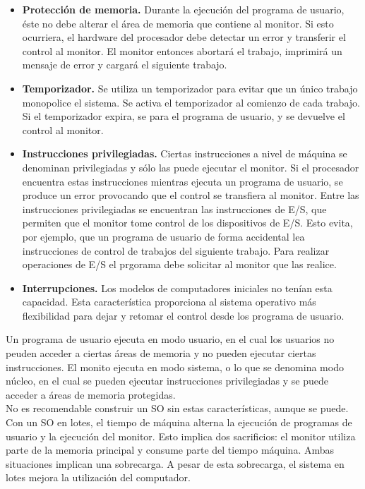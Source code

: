 \documentclass{article}
\begin{document}
					\begin{itemize}
					\item \textbf{Protección de memoria.} Durante la ejecución del programa de usuario, éste no debe alterar el área de memoria que contiene al monitor. Si esto ocurriera, el hardware del procesador debe detectar un error y transferir el control al monitor. El monitor entonces abortará el trabajo, imprimirá un mensaje de error y cargará el siguiente trabajo.
					
					\item \textbf{Temporizador.} Se utiliza un temporizador para evitar que un único trabajo monopolice el sistema. Se activa el temporizador al comienzo de cada trabajo. Si el temporizador expira, se para el programa de usuario, y se devuelve el control al monitor.
					
					\item \textbf{Instrucciones privilegiadas.} Ciertas instrucciones a nivel de máquina se denominan privilegiadas y sólo las puede ejecutar el monitor. Si el procesador encuentra estas instrucciones mientras ejecuta un programa de usuario, se produce un error provocando que el control se transfiera al monitor. Entre las instrucciones privilegiadas se encuentran las instrucciones de E/S, que permiten que el monitor tome control de los dispositivos de E/S. Esto evita, por ejemplo, que un programa de usuario de forma accidental lea instrucciones de control de trabajos del siguiente trabajo. Para realizar operaciones de E/S el prgorama debe solicitar al monitor que las realice.
					
					\item \textbf{Interrupciones.} Los modelos de computadores iniciales no tenían esta capacidad. Esta característica proporciona al sistema operativo más flexibilidad para dejar y retomar el control desde los programa de usuario.
					\end{itemize}
							
					Un programa de usuario ejecuta en modo usuario, en el cual los usuarios no peuden acceder a ciertas áreas de memoria y no pueden ejecutar ciertas instrucciones. El monito ejecuta en modo sistema, o lo que se denomina modo núcleo, en el cual se pueden ejecutar instrucciones privilegiadas y se puede acceder a áreas de memoria protegidas. \\
					
					No es recomendable construir un SO sin estas características, aunque se puede. Con un SO en lotes, el tiempo de máquina alterna la ejecución de programas de usuario y la ejecución del monitor. Esto implica dos sacrificios: el monitor utiliza parte de la memoria principal y consume parte del tiempo máquina. Ambas situaciones implican una sobrecarga. A pesar de esta sobrecarga, el sistema en lotes mejora la utilización del computador.	\\
					
\end{document}
